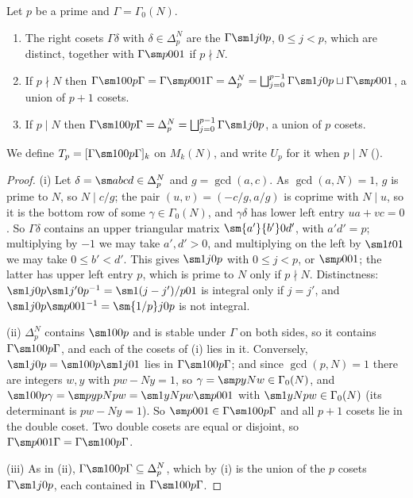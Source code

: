 \begin{proposition}\label{prop:hecke:coset-decomposition}
Let $p$ be a prime and $\Gamma=\Gamma_0(N)$.
\begin{enumerate}[label=(\roman*)]
\item The right cosets $\Gamma\delta$ with $\delta\in\Delta_p^N$ are the $\Gamma\sm1j0p$, $0\le j<p$, which are distinct, together with $\Gamma\sm p001$ if $p\nmid N$.
\item If $p\nmid N$ then $\Gamma\sm100p\Gamma=\Gamma\sm p001\Gamma=\Delta_p^N=\bigsqcup_{j=0}^{p-1}\Gamma\sm1j0p\sqcup\Gamma\sm p001$, a union of $p+1$ cosets.
\item If $p\mid N$ then $\Gamma\sm100p\Gamma=\Delta_p^N=\bigsqcup_{j=0}^{p-1}\Gamma\sm1j0p$, a union of $p$ cosets.
\end{enumerate}
We define $T_p=[\Gamma\sm100p\Gamma]_k$ on $M_k(N)$, and write $U_p$ for it when $p\mid N$ ().
\end{proposition}

\begin{proof}
(i) Let $\delta=\sm abcd\in\Delta_p^N$ and $g=\gcd(a,c)$. As $\gcd(a,N)=1$, $g$ is prime to $N$, so $N\mid c/g$; the pair $(u,v)=(-c/g,a/g)$ is coprime with $N\mid u$, so it is the
bottom row of some $\gamma\in\Gamma_0(N)$, and $\gamma\delta$ has lower left entry $ua+vc=0$. So $\Gamma\delta$ contains an upper triangular matrix $\sm{a'}{b'}0{d'}$, with $a'd'=p$; multiplying
by $-1$ we may take $a',d'>0$, and multiplying on the left by $\sm1t01$ we may take $0\le b'<d'$. This gives $\sm1j0p$ with $0\le j<p$, or $\sm p001$; the latter has upper left
entry $p$, which is prime to $N$ only if $p\nmid N$. Distinctness: $\sm1j0p\sm1{j'}0p^{-1}=\sm1{(j-j')/p}01$ is integral only if $j=j'$, and $\sm1j0p\sm p001^{-1}=\sm{1/p}j0p$ is not
integral.

(ii) $\Delta_p^N$ contains $\sm100p$ and is stable under $\Gamma$ on both sides, so it contains $\Gamma\sm100p\Gamma$, and each of the cosets of (i) lies in it. Conversely,
$\sm1j0p=\sm100p\sm1j01$ lies in $\Gamma\sm100p\Gamma$; and since $\gcd(p,N)=1$ there are integers $w,y$ with $pw-Ny=1$, so $\gamma=\sm py N w\in\Gamma_0(N)$, and
$\sm100p\gamma=\sm py{pN}{pw}=\sm1y N{pw}\sm p001$ with $\sm 1yN{pw}\in\Gamma_0(N)$ (its determinant is $pw-Ny=1$). So $\sm p001\in\Gamma\sm100p\Gamma$ and all $p+1$ cosets lie in the double
coset. Two double cosets are equal or disjoint, so $\Gamma\sm p001\Gamma=\Gamma\sm100p\Gamma$.

(iii) As in (ii), $\Gamma\sm100p\Gamma\subseteq\Delta_p^N$, which by (i) is the union of the $p$ cosets $\Gamma\sm1j0p$, each contained in $\Gamma\sm100p\Gamma$.
\end{proof}

